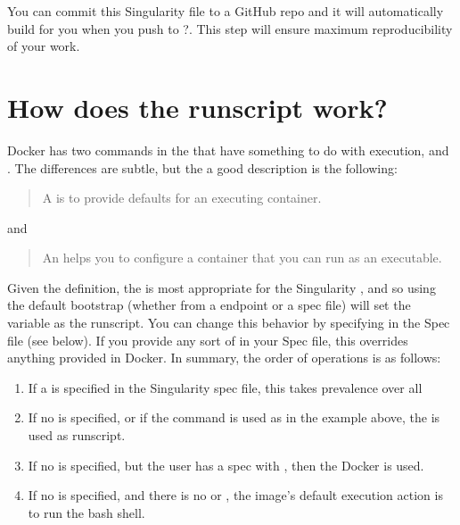 \documentclass[letterpaper,10pt,english]{sphinxmanual}
\begin{document}
You can commit this Singularity file to a GitHub repo
and it will automatically build for you when you push to ?. This step will ensure maximum reproducibility of your work.


\section{How does the runscript work?}
\label{\detokenize{singularity_and_docker:how-does-the-runscript-work}}
Docker has two commands in the  that have something to do with
execution,  and . The differences are subtle, but the a good description is the following:
\begin{quote}

A  is to provide defaults for an executing container.
\end{quote}

and
\begin{quote}

An  helps you to configure a container that you can run as an
executable.
\end{quote}

Given the definition, the  is most appropriate for the Singularity  , and
so using the default bootstrap (whether from a  endpoint or a  spec file)
will set the  variable as the runscript. You can change this behavior by
specifying  in the Spec file (see below). If you provide any sort of  in
your Spec file, this overrides anything provided in Docker. In summary,
the order of operations is as follows:
\begin{enumerate}
\item {} 
If a  is specified in the Singularity spec file, this takes prevalence
over all

\item {} 
If no  is specified, or if the  command is used as in the example
above, the  is used as runscript.

\item {} 
If no  is specified, but the user has a  spec with  , then the Docker  is
used.

\item {} 
If no  is specified, and there is no  or  , the image’s default
execution action is to run the bash shell.

\end{enumerate}
\end{document}

